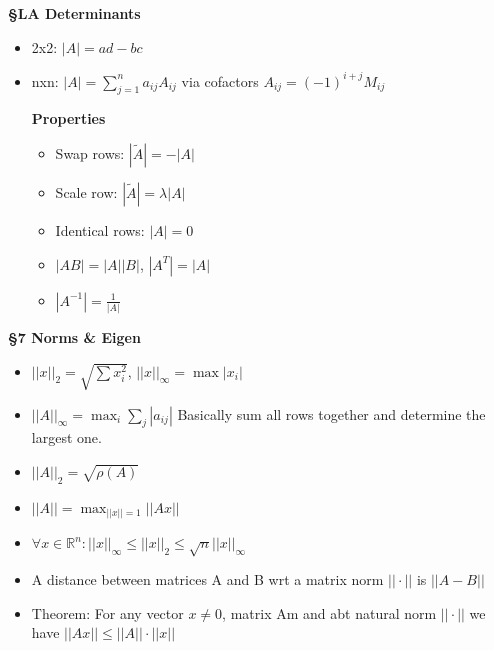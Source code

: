 \documentclass{article}
\begin{document}
\begin{tcolorbox}[colframe=black,colback=white,boxrule=0.3pt,arc=1pt,
left=0pt,right=0pt,top=0pt,bottom=0pt]
\begin{minipage}[t]{0.49\textwidth}
\textbf{\S LA Determinants}
\begin{itemize}
\item 2x2: $|A|=ad-bc$
\item nxn: $|A|=\sum_{j=1}^n a_{ij}A_{ij}$ via cofactors $A_{ij}=(-1)^{i+j}M_{ij}$
\begin{minipage}[t]{0.45\textwidth}
\textbf{Properties}
    \begin{itemize}
        \item Swap rows: $|\tilde{A}| = -|A|$
        \item Scale row: $|\tilde{A}| = \lambda |A|$
    \end{itemize}
\end{minipage}
\hfill
\begin{minipage}[t]{0.45\textwidth}
    \begin{itemize}
        \item Identical rows: $|A| = 0$
        \item $|AB| = |A||B|$, \quad $|A^T| = |A|$
        \item $|A^{-1}| = \frac{1}{|A|}$
    \end{itemize}
\end{minipage}
\end{itemize}
\textbf{\S7 Norms \& Eigen}\\
\begin{minipage}[t]{0.45\textwidth}
\begin{itemize}
\item $||x||_2=\sqrt{\sum x_i^2}$, $||x||_\infty=\max|x_i|$
\item $||A||_\infty=\max_i\sum_j|a_{ij}|$ Basically sum all rows together and determine the largest one.
\end{itemize}
\end{minipage}
\begin{minipage}[t]{0.45\textwidth}
\begin{itemize}
\item $||A||_2 = \sqrt{\rho(A)}$
\item $||A|| = \max_{||x||=1}||Ax||$
\end{itemize}
\end{minipage}
\begin{itemize}
\item $\forall x \in \mathbb{R}^n: ||x||_\infty \le ||x||_2 \le \sqrt{n}||x||_\infty$
\item A distance between matrices A and B wrt a matrix norm $||\cdot||$ is $||A-B||$
\item Theorem: For any vector $x\ne0$, matrix Am and abt natural norm $||\cdot||$ we have $||Ax|| \le ||A||\cdot||x||$

\end{itemize}
\end{minipage}
\end{tcolorbox}
\end{document}
